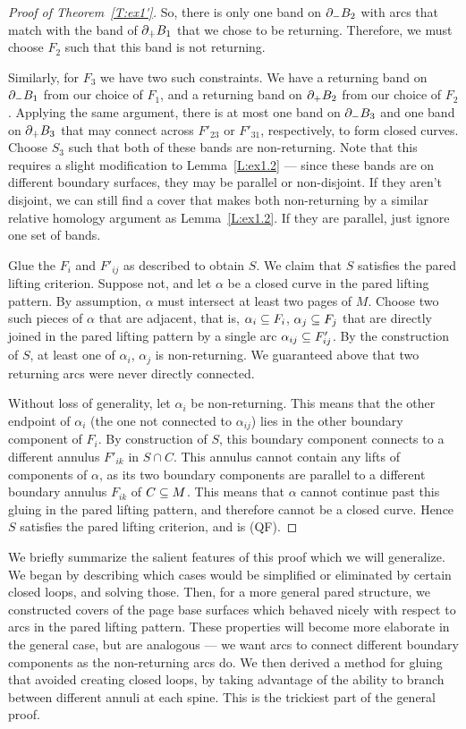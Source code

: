 \begin{proof}[Proof of Theorem~\ref{T:ex1'}]
So, there is only one band on $\partial_-B_2$ with arcs that match with the band of
$\partial_+B_1$ that we chose to be returning. Therefore, we must choose $F_2$ such
that this band is not returning.

Similarly, for $F_3$ we have two such constraints.  We have a returning band on
$\partial_-B_1$ from our choice of $F_1$, and a returning band on $\partial_+B_2$ from
our choice of $F_2$.  Applying the same argument, there is at most one band on
$\partial_-B_3$ and one band on $\partial_+B_3$ that may connect across $F'_{23}$ or
$F'_{31}$, respectively, to form closed curves.  Choose $S_3$ such that both of
these bands are non-returning. Note that this requires a slight modification to
Lemma~\ref{L:ex1.2} --- since these bands are on different boundary surfaces,
they may be parallel or non-disjoint.  If they aren't disjoint, we can still
find a cover that makes both non-returning by a similar relative homology
argument as Lemma~\ref{L:ex1.2}. If they are parallel, just ignore one set of
bands.

Glue the $F_i$ and $F'_{ij}$ as described to obtain $S$. We claim that $S$
satisfies the pared lifting criterion. Suppose not, and let $\alpha$ be
a closed curve in the pared lifting pattern.  By assumption, $\alpha$ must
intersect at least two pages of $M$. Choose two such pieces of $\alpha$ that
are adjacent, that is, $\alpha_i\subseteq F_i$, $\alpha_j \subseteq F_j$ that are
directly joined in the pared lifting pattern by a single arc $\alpha_{ij} \subseteq
F'_{ij}$.  By the construction of $S$, at least one of $\alpha_i$, $\alpha_j$
is non-returning. We guaranteed above that two returning arcs were never
directly connected.

Without loss of generality, let $\alpha_i$ be non-returning. This means that
the other endpoint of $\alpha_i$ (the one not connected to $\alpha_{ij}$) lies
in the other boundary component of $F_i$. By construction of $S$, this boundary
component connects to a different annulus $F'_{ik}$ in $S\cap C$. This annulus
cannot contain any lifts of components of $\alpha$, as its two boundary
components are parallel to a different boundary annulus $F_{ik}$ of $C\subseteq M$.
This means that $\alpha$ cannot continue past this gluing in the pared lifting
pattern, and therefore cannot be a closed curve. Hence $S$ satisfies the pared
lifting criterion, and is (QF).

\end{proof}

We briefly summarize the salient features of this proof which we will
generalize.  We began by describing which cases would be simplified or
eliminated by certain closed loops, and solving those. Then, for a more general
pared structure, we constructed covers of the page base surfaces which behaved
nicely with respect to arcs in the pared lifting pattern.  These properties
will become more elaborate in the general case, but are analogous --- we want
arcs to connect different boundary components as the non-returning arcs do.  We
then derived a method for gluing that avoided creating closed loops, by taking
advantage of the ability to branch between different annuli at each spine. This
is the trickiest part of the general proof.
